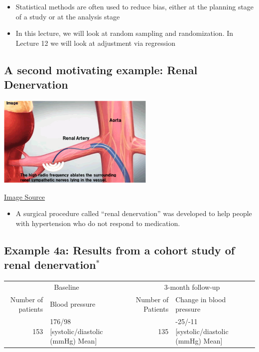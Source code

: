 \documentclass[
]{book}
\providecommand{\tightlist}{%
  \setlength{\itemsep}{0pt}\setlength{\parskip}{0pt}}
\begin{document}
\begin{itemize}
\tightlist
\item
  Statistical methods are often used to reduce bias, either at the planning stage of a study or at the analysis stage
\item
  In this lecture, we will look at random sampling and randomization. In Lecture 12 we will look at adjustment via regression
\end{itemize}

\hypertarget{a-second-motivating-example-renal-denervation}{%
\subsection{A second motivating example: Renal Denervation}\label{a-second-motivating-example-renal-denervation}}

\includegraphics[width=0.5\linewidth]{./1_28}

\href{https://www.terumo.com/about/pressrelease/2013/20130408.html}{Image Source}

\begin{itemize}
\tightlist
\item
  A surgical procedure called ``renal denervation'' was developed to help people with hypertension who do not respond to medication.
\end{itemize}

\hypertarget{example-4a-results-from-a-cohort-study-of-renal-denervation}{%
\subsection{\texorpdfstring{Example 4a: Results from a cohort study of renal denervation\(^*\)}{Example 4a: Results from a cohort study of renal denervation\^{}*}}\label{example-4a-results-from-a-cohort-study-of-renal-denervation}}

\begin{table}
\centering
\begin{tabular}{r|l|r|l}
\hline
\multicolumn{2}{c|}{Baseline} & \multicolumn{2}{c}{3-month follow-up} \\
\cline{1-2} \cline{3-4}
Number of patients & Blood pressure & Number of Patients & Change in blood pressure\\
\hline
153 & 176/98 [systolic/diastolic (mmHg) Mean] & 135 & -25/-11 [systolic/diastolic (mmHg) Mean]\\
\hline
\end{tabular}
\end{table}
\end{document}
